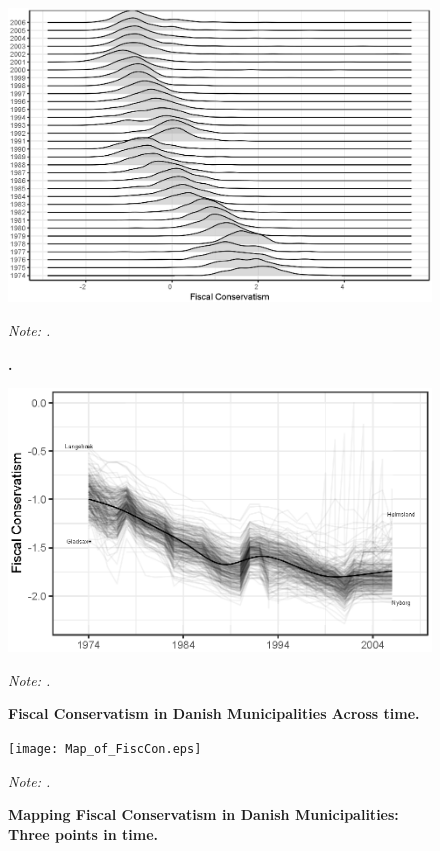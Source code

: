 \documentclass[12pt,a4]{article}
\newcommand\fnote[1]{\captionsetup{font=small}\caption*{#1}}
\begin{document}
\begin{figure}[H]
	\centering
	\includegraphics[scale = .8]{JoyPlotFiscal.eps}
	\caption{\textbf{.}} \fnote{ \emph{Note: .}}
	\label{fig:bar}
\end{figure}


\begin{figure}[H]
	\includegraphics[scale = 1.2]{times_lines.eps}
	\caption{\textbf{Fiscal Conservatism in Danish Municipalities Across time.}} \fnote{ \emph{Note: .}}
	\label{fig:bar}
\end{figure}


\begin{landscape}
	\begin{figure}[H]
		\texttt{[image: Map\_of\_FiscCon.eps]}
		\caption{\textbf{Mapping Fiscal Conservatism in Danish Municipalities: Three points in time.}} \fnote{ \emph{Note: .}}
		\label{fig:bar}
	\end{figure}
\end{landscape}	
\end{document}
